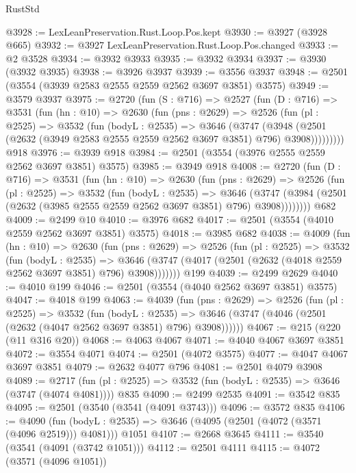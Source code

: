 \begin{lexlean}{RustStd}
\begin{coremodule}
{\begin{coremodule}
{{{{{{{{{{{{{{{{{{{{@3928 := LexLeanPreservation.Rust.Loop.Pos.kept
@3930 := @3927 (@3928 @665)
@3932 := @3927 LexLeanPreservation.Rust.Loop.Pos.changed
@3933 := @2 @3528
@3934 := @3932 @3933
@3935 := @3932 @3934
@3937 := @3930 (@3932 @3935)
@3938 := @3926 @3937
@3939 := @3556 @3937
@3948 := @2501 (@3554 (@3939 @2583 @2555 @2559 @2562 @3697 @3851) @3575)
@3949 := @3579 @3937
@3975 := @2720
    (fun (S : @716) =>
    @2527
      (fun (D : @716) =>
      @3531
        (fun (hn : @10) =>
        @2630
          (fun (pns : @2629) =>
          @2526
            (fun (pl : @2525) =>
            @3532
              (fun (bodyL : @2535) =>
              @3646
                (@3747
                  (@3948
                    (@2501 (@2632 (@3949 @2583 @2555 @2559 @2562 @3697 @3851) @796) @3908)))))))))
    @918
@3976 := @3939 @918
@3984 := @2501 (@3554 (@3976 @2555 @2559 @2562 @3697 @3851) @3575)
@3985 := @3949 @918
@4008 := @2720
    (fun (D : @716) =>
    @3531
      (fun (hn : @10) =>
      @2630
        (fun (pns : @2629) =>
        @2526
          (fun (pl : @2525) =>
          @3532
            (fun (bodyL : @2535) =>
            @3646
              (@3747 (@3984 (@2501 (@2632 (@3985 @2555 @2559 @2562 @3697 @3851) @796) @3908))))))))
    @682
@4009 := @2499 @10
@4010 := @3976 @682
@4017 := @2501 (@3554 (@4010 @2559 @2562 @3697 @3851) @3575)
@4018 := @3985 @682
@4038 := @4009
    (fun (hn : @10) =>
    @2630
      (fun (pns : @2629) =>
      @2526
        (fun (pl : @2525) =>
        @3532
          (fun (bodyL : @2535) =>
          @3646 (@3747 (@4017 (@2501 (@2632 (@4018 @2559 @2562 @3697 @3851) @796) @3908)))))))
    @199
@4039 := @2499 @2629
@4040 := @4010 @199
@4046 := @2501 (@3554 (@4040 @2562 @3697 @3851) @3575)
@4047 := @4018 @199
@4063 := @4039
    (fun (pns : @2629) =>
    @2526
      (fun (pl : @2525) =>
      @3532
        (fun (bodyL : @2535) =>
        @3646 (@3747 (@4046 (@2501 (@2632 (@4047 @2562 @3697 @3851) @796) @3908))))))
@4067 := @215 (@220 (@11 @316 @20))
@4068 := @4063 @4067
@4071 := @4040 @4067 @3697 @3851
@4072 := @3554 @4071
@4074 := @2501 (@4072 @3575)
@4077 := @4047 @4067 @3697 @3851
@4079 := @2632 @4077 @796
@4081 := @2501 @4079 @3908
@4089 := @2717 (fun (pl : @2525) => @3532 (fun (bodyL : @2535) => @3646 (@3747 (@4074 @4081)))) @835
@4090 := @2499 @2535
@4091 := @3542 @835
@4095 := @2501 (@3540 (@3541 (@4091 @3743)))
@4096 := @3572 @835
@4106 := @4090
    (fun (bodyL : @2535) => @3646 (@4095 (@2501 (@4072 (@3571 (@4096 @2519))) @4081)))
    @1051
@4107 := @2668 @3645
@4111 := @3540 (@3541 (@4091 (@3742 @1051)))
@4112 := @2501 @4111
@4115 := @4072 (@3571 (@4096 @1051))
}}}}}}}}}}}}}}}}}}}}
\end{coremodule}}
\end{coremodule}
\end{lexlean}
